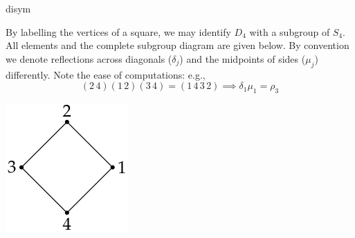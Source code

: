 \begin{examples}{}{disym}
\begin{enumerate}
		\begin{minipage}[t]{0.77\linewidth}\vspace{0pt}
			\item By labelling the vertices of a square, we may identify $D_4$ with a subgroup of $S_4$. All elements and the complete subgroup diagram are given below. By convention we denote reflections across diagonals ($\delta_j$) and the midpoints of sides ($\mu_j$) differently.\smallbreak
			Note the ease of computations: e.g.,
			\[
				(2\,4)(1\,2)(3\,4)=(1\,4\,3\,2)\implies \delta_1\mu_1=\rho_3
			\]
		\end{minipage}
		\hfill
		\begin{minipage}[t]{0.22\linewidth}\vspace{0pt}
			\flushright\includegraphics{perm-d4}
		\end{minipage}\medbreak
	
	

\end{enumerate}
\end{examples}
